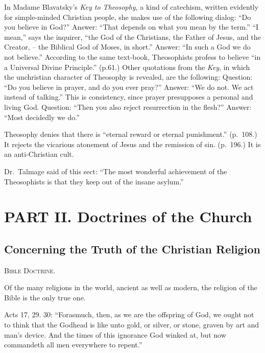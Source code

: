 \documentclass[
]{book}
\begin{document}
In Madame Blavatsky's \emph{Key to Theosophy}, a kind of catechism, written evidently for simple-minded Christian people, she makes use of the following dialog: ``Do you believe in God?'' Answer: ``That depends on what you mean by the term.'' ``I mean,'' says the inquirer, ``the God of the Christians, the Father of Jesus, and the Creator, -- the Biblical God of Moses, in short.'' Answer: ``In such a God we do not believe.'' According to the same text-book, Theosophists profess to believe ``in a Universal Divine Principle.'' (p.61.) Other quotations from the \emph{Key}, in which the unchristian character of Theosophy is revealed, are the following: Question: ``Do you believe in prayer, and do you ever pray?'' Answer: ``We do not. We act instead of talking.'' This is consistency, since prayer presupposes a personal and living God. Question: ``Then you also reject resurrection in the flesh?'' Answer: ``Most decidedly we do.''

Theosophy denies that there is ``eternal reward or eternal punishment.'' (p.~108.) It rejects the vicarious atonement of Jesus and the remission of sin. (p.~196.) It is an anti-Christian cult.

Dr.~Talmage said of this sect: ``The most wonderful achievement of the Theosophists is that they keep out of the insane asylum.''

\chapter*{PART II. Doctrines of the Church}\label{part-ii.-doctrines-of-the-church}

\section{\texorpdfstring{Concerning the Truth of the Christian Religion}{Concerning the Truth of the Christian Religion}}\label{concerning-the-truth-of-the-christian-religion}

\begin{center}
\textsc{Bible Doctrine.}
\end{center}

Of the many religions in the world, ancient as well as modern, the religion of the Bible is the only true one.

Acts 17, 29. 30: ``Forasmuch, then, as we are the offspring of God, we ought not to think that the Godhead is like unto gold, or silver, or stone, graven by art and man's device. And the times of this ignorance God winked at, but now commandeth all men everywhere to repent.''
\end{document}
